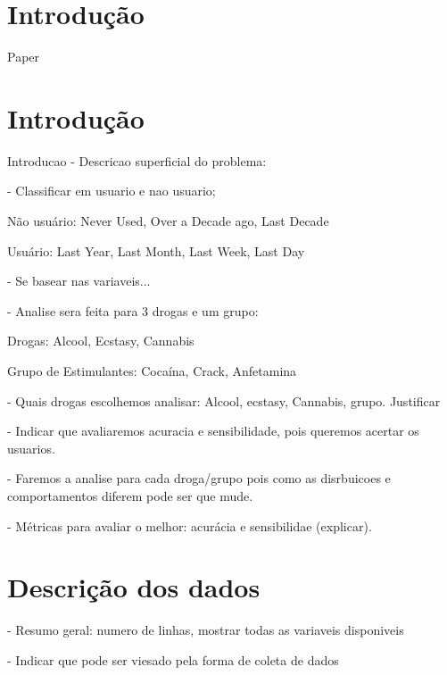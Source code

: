 \documentclass[
	article,			%
	11pt,				%
	oneside,			%
	a4paper,			%
	english,			%
	brazil,				%
	sumario=tradicional
	]{abntex2}
\begin{document}
\textual
\section*{Introdução}


Paper \cite{fehrman2015}

\section{Introdução}

Introducao - Descricao superficial do problema:

- Classificar em usuario e nao usuario;

Não usuário: Never Used, Over a Decade ago, Last Decade

Usuário: Last Year, Last Month, Last Week, Last Day

- Se basear nas variaveis...

- Analise sera feita para 3 drogas e um grupo:

Drogas: Alcool, Ecstasy, Cannabis

Grupo de Estimulantes: Cocaína, Crack, Anfetamina

- Quais drogas escolhemos analisar: Alcool, ecstasy, Cannabis, grupo. Justificar

- Indicar que avaliaremos acuracia e sensibilidade, pois queremos acertar os usuarios.

- Faremos a analise para cada droga/grupo pois como as disrbuicoes e comportamentos diferem pode ser que mude.

- Métricas para avaliar o melhor: acurácia e sensibilidae (explicar).

\section{Descrição dos dados}

- Resumo geral: numero de linhas, mostrar todas as variaveis disponiveis

- Indicar que pode ser viesado pela forma de coleta de dados
\end{document}
